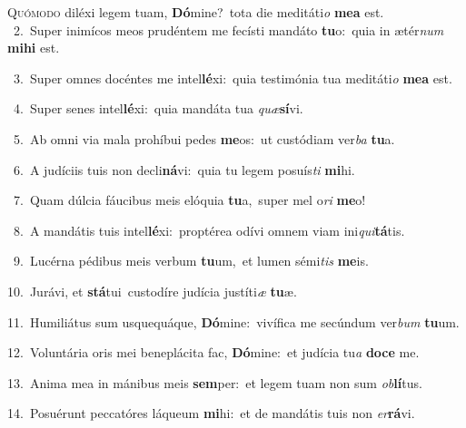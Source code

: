 \lettrine{\initial\textcolor{\initialcolor}{Q}}{uómodo} diléxi legem tuam, \textbf{Dó}\-mine?~\star tota die meditáti\textit{o} \textbf{me}\-\textbf{a} est.\\
{\numbfont\textcolor{\numbcolor}{~2.}}~Super inimícos meos prudéntem me fecísti mandáto \textbf{tu}\-o:~\star quia in ætér\textit{num} \textbf{mi}\-\textbf{hi} est.\par
{\numbfont\textcolor{\numbcolor}{~3.}}~Super omnes docéntes me intel\-\textbf{lé}\-xi:~\star quia testimónia tua meditáti\textit{o} \textbf{me}\-\textbf{a} est.\par
{\numbfont\textcolor{\numbcolor}{~4.}}~Super senes intel\-\textbf{lé}\-xi:~\star quia mandáta tua \textit{quæ}\-\textbf{sí}vi.\par
{\numbfont\textcolor{\numbcolor}{~5.}}~Ab omni via mala prohíbui pedes \textbf{me}\-os:~\star ut custódiam ver\textit{ba} \textbf{tu}\-a.\par
{\numbfont\textcolor{\numbcolor}{~6.}}~A judíciis tuis non decli\-\textbf{ná}\-vi:~\star quia tu legem posuís\textit{ti} \textbf{mi}\-hi.\par
{\numbfont\textcolor{\numbcolor}{~7.}}~Quam dúlcia fáucibus meis elóquia \textbf{tu}\-a,~\star super mel o\textit{ri} \textbf{me}\-o!\par
{\numbfont\textcolor{\numbcolor}{~8.}}~A mandátis tuis intel\-\textbf{lé}\-xi:~\star proptérea odívi omnem viam ini\-\textit{qui}\-\textbf{tá}tis.\par
{\numbfont\textcolor{\numbcolor}{~9.}}~Lucérna pédibus meis verbum \textbf{tu}\-um,~\star et lumen sémi\textit{tis} \textbf{me}\-is.\par
{\numbfont\textcolor{\numbcolor}{10.}}~Jurávi, et \textbf{stá}\-tui~\star custodíre judícia justíti\textit{æ} \textbf{tu}\-æ.\par
{\numbfont\textcolor{\numbcolor}{11.}}~Humiliátus sum usquequáque, \textbf{Dó}\-mine:~\star vivífica me secúndum ver\textit{bum} \textbf{tu}\-um.\par
{\numbfont\textcolor{\numbcolor}{12.}}~Voluntária oris mei beneplácita fac, \textbf{Dó}\-mine:~\star et judícia tu\textit{a} \textbf{do}\-\textbf{ce} me.\par
{\numbfont\textcolor{\numbcolor}{13.}}~Anima mea in mánibus meis \textbf{sem}\-per:~\star et legem tuam non sum \textit{ob}\-\textbf{lí}tus.\par
{\numbfont\textcolor{\numbcolor}{14.}}~Posuérunt peccatóres láqueum \textbf{mi}\-hi:~\star et de mandátis tuis non \textit{er}\-\textbf{rá}vi.\par
